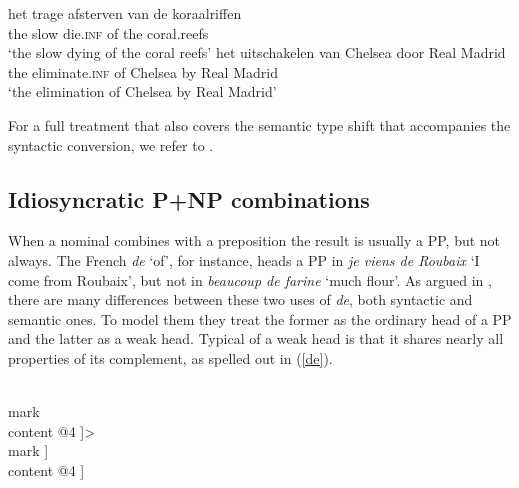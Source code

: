 \documentclass[output=paper
                ,modfonts
                ,nonflat
	        ,collection
	        ,collectionchapter
	        ,collectiontoclongg
 	        ,biblatex
                ,babelshorthands
                ,newtxmath
                ,draftmode
                ,colorlinks, citecolor=brown
]{./langsci/langscibook}
\begin{document}
\begin{exe} 
\ex\label{van} 
\gll   het trage afsterven van de koraalriffen   \\
       the slow die.\textsc{inf} of the coral.reefs \\
\trans `the slow dying of the coral reefs' 
\ex\label{door}
\gll   het uitschakelen van Chelsea door Real Madrid      \\
       the eliminate.\textsc{inf} of Chelsea by Real Madrid  \\ 
\trans `the elimination of Chelsea by Real Madrid'  
\end{exe} 

For a full treatment that also covers the semantic type shift that 
accompanies the syntactic conversion, we refer to \citet{VanEynde19}.


\subsection{Idiosyncratic P+NP combinations} 


When a nominal combines with a preposition the result is usually a PP, but 
not always. The French \emph{de} `of', for instance, heads a PP in 
\emph{je viens de Roubaix} `I come from Roubaix', 
but not in \emph{beaucoup de farine} `much flour'. 
As argued in \citet{Abeilleetal04}, there are many differences 
between these two uses of \emph{de}, both syntactic and semantic ones.
To model them they treat the former as the ordinary head of a PP and 
the latter as a weak head. Typical of a weak head is that it shares 
nearly all properties of its complement, as spelled out in (\ref{de}).

\begin{exe} 
\ex\label{de} 
\begin{avm} 
[cat [head @1                              \\
      subj @A                              \\
      spr @B                               \\
      comps <[cat [head @1               \\
                     subj @A               \\
                     spr @B                \\
                     comps < >]          \\
                     mark  \\
                content @4 ]>              \\ 
      mark ]                      \\
 content @4 ] 
\end{avm}
\end{exe} 
\end{document}
